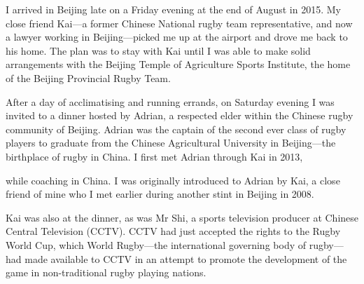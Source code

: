 


I arrived in Beijing late on a Friday evening at the end of August in 2015.  My close friend Kai---a former Chinese National rugby team representative, and now a lawyer working in Beijing---picked me up at the airport and drove me back to his home.  The plan was to stay with Kai until I was able to make solid arrangements with the Beijing Temple of Agriculture Sports Institute, the home of the Beijing Provincial Rugby Team.

After a day of acclimatising and running errands, on Saturday evening I was invited to a dinner hosted by Adrian, a respected elder within the Chinese rugby community of Beijing.  Adrian was the captain of the second ever class of rugby players to graduate from the Chinese Agricultural University in Beijing---the birthplace of rugby in China.
I first met Adrian through Kai in 2013,

 while coaching in China.  I was originally introduced to Adrian by Kai, a close friend of mine who I met earlier during another stint in Beijing in 2008.

 Kai was also at the dinner, as was Mr Shi, a sports television producer at Chinese Central Television (CCTV).  CCTV had just accepted the rights to the Rugby World Cup, which World Rugby---the international governing body of rugby---had made available to CCTV in an attempt to promote the development of the game in non-traditional rugby playing nations.


